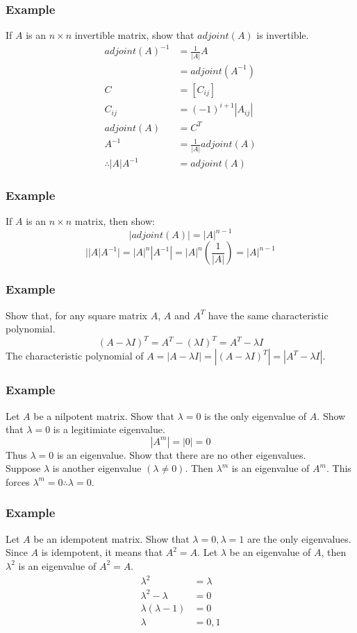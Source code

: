 \documentclass{math}
\begin{document}
\subsubsection*{Example}
If \( A \) is an \( n\times n \) invertible matrix, show that \( adjoint(A) \)
is invertible.
\begin{align*}
  adjoint(A)^{-1} &= \frac{1}{|A|}A \\
  &= adjoint(A^{-1}) \\
  C &= [C_{ij}] \\
  C_{ij} &= (-1)^{i+1}|A_{ij}| \\
  adjoint(A) &= C^T \\
  A^{-1} &= \frac{1}{|A|}adjoint(A) \\
  \therefore |A|A^{-1} &= adjoint(A)
\end{align*}

\subsubsection*{Example}
If \( A \) is an \( n\times n \) matrix, then show:
\[ |adjoint(A)| = |A|^{n-1} \]
\[ \bigg||A|A^{-1}\bigg| = |A|^n|A^{-1}| = |A|^n(\frac{1}{|A|}) = |A|^{n-1} \]

\subsubsection*{Example}
Show that, for any square matrix \( A \), \( A \) and \( A^T \) have the same
characteristic polynomial.
\[ (A-\lambda I)^T = A^T-(\lambda I)^T = A^T-\lambda I \]
The characteristic polynomial of \( A = |A-\lambda I| = |(A-\lambda I)^T| =
|A^T-\lambda I| \).

\subsubsection*{Example}
Let \( A \) be a nilpotent matrix. Show that \( \lambda = 0 \) is the only
eigenvalue of \( A \). Show that \( \lambda = 0 \) is a legitimiate eigenvalue.
\[ |A^m| = |0| = 0 \]
Thus \( \lambda = 0 \) is an eigenvalue. Show that there are no other
eigenvalues. \\
Suppose \( \lambda \) is another eigenvalue \( (\lambda\ne0) \).
Then \( \lambda^m \) is an eigenvalue of \( A^m \). This forces \( \lambda^m =
0 \therefore \lambda = 0 \).

\subsubsection*{Example}
Let \( A \) be an idempotent matrix. Show that \( \lambda = 0,\lambda = 1 \) are
the only eigenvalues. \\
Since \( A \) is idempotent, it means that \( A^2 = A \). Let \( \lambda \) be
an eigenvalue of \( A \), then \( \lambda^2 \) is an eigenvalue of
\( A^2 = A \).
\begin{align*}
  \lambda^2 &= \lambda \\
  \lambda^2-\lambda &= 0 \\
  \lambda(\lambda-1) &= 0 \\
  \lambda &= 0,1
\end{align*}
\end{document}
